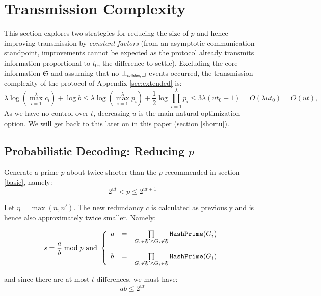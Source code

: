\documentclass[11pt]{llncs}
\begin{document}
\section{Transmission Complexity}
\label{trans}
This section explores two strategies for reducing the size of $p$ and hence improving transmission by {\sl constant factors} (from an asymptotic communication standpoint, improvements cannot be expected as the protocol already transmits information proportional to $t_0$, the difference to settle). Excluding the core information $\mathfrak{S}$ and assuming that no $\bot_{\mbox{{\tiny {\sf collision}}},\square}$ events occurred, the transmission complexity of the protocol of Appendix \ref{sec:extended} is:
$$
\lambda \log (\max_{i=1}^\lambda c_i) + \log b \leq \lambda \log (\max_{i=1}^\lambda p_i) + \frac12 \log \prod_{i=1}^\lambda p_i \leq 3\lambda (ut_0+1)=O(\lambda ut_0)=O(ut),
$$
As we have no control over $t$, decreasing $u$ is the main natural optimization option. We will get back to this later on in this paper (section \ref{shortu}).

\subsection{Probabilistic Decoding: Reducing $p$}

Generate a prime $p$ about twice shorter than the $p$ recommended in section \ref{basic}, namely:
\begin{equation}
\label{eqnewp}
2^{ut}<p \leq 2^{ut+1}
\end{equation}

Let $\eta=\max(n,n')$. The new redundancy $c$ is calculated as previously and is hence also approximately twice smaller. Namely:

$$s=\frac{a}{b} \bmod p \mbox{~and~}
\left\{
\begin{array}{lcr}
a & =&  \prod\limits_{G_i \in \mathfrak{F}'\wedge G_i \not\in\mathfrak{F}} \mbox{{\tt HashPrime}}(G_i) \\
\\
b & = & \prod\limits_{G_i \not\in\mathfrak{F}' \wedge G_i \in\mathfrak{F}} \mbox{{\tt HashPrime}}(G_i)
\end{array}
\right.
$$

and since there are at most $t$ differences, we must have:
\begin{equation}
\label{eqab}
a b \leq 2^{ut}
\end{equation}
\end{document}
